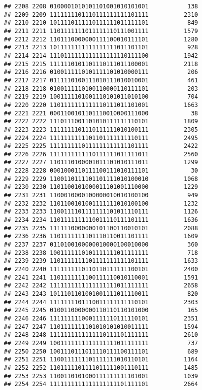 \documentclass[]{article}
\begin{document}
\begin{verbatim}
## 2208 2208 0100001010101101001010101001           138
## 2209 2209 1111111101110111111111101111          2310
## 2210 2210 1011110111110111111011111101           849
## 2211 2211 1101111111011111110111001111          1579
## 2212 2212 1101110000000111100010111101          1280
## 2213 2213 1011111111111111111011101101           928
## 2214 2214 1110111111111111111110111100          1942
## 2215 2215 1111110101101110111011100001          2118
## 2216 2216 0100111110101111101010000111           206
## 2217 2217 0111110100111010111010010001           461
## 2218 2218 0100111110100110000110111101           203
## 2219 2219 1001111101001110101011010100           704
## 2220 2220 1101111111111110111011101001          1663
## 2221 2221 0001100101101110010000111000            38
## 2222 2222 1110111001101010111111110101          1809
## 2223 2223 1111111101110111111010100111          2305
## 2224 2224 1111111111101101111111110111          2495
## 2225 2225 1111111110111111111111101111          2422
## 2226 2226 1111111111110111111011111011          2560
## 2227 2227 1101110100001011101010111011          1299
## 2228 2228 0001000110111100111010111101            30
## 2229 2229 1100110111101101111010100010          1068
## 2230 2230 1101100101000011101001110000          1229
## 2231 2231 1100010000100000010010100100           949
## 2232 2232 1101100101001111111010100100          1232
## 2233 2233 1100111101111111101011110111          1126
## 2234 2234 1101111111110011110111101111          1636
## 2235 2235 1111110000000101100110010101          2088
## 2236 2236 1101111111101110110011101111          1609
## 2237 2237 0110100100000010000100010000           360
## 2238 2238 1001111110101111111011111111           718
## 2239 2239 1101111111101111111111101111          1633
## 2240 2240 1111111110110110111111100101          2400
## 2241 2241 1101111111100111110010110001          1591
## 2242 2242 1111111111111111111011111111          2658
## 2243 2243 1011101101001001111011110011           820
## 2244 2244 1111111101110011111111110101          2303
## 2245 2245 0100110000000110110110101000           165
## 2246 2246 1111111110001111110111110101          2351
## 2247 2247 1101111111101010101010011111          1594
## 2248 2248 1111111111111110111101111111          2610
## 2249 2249 1001111111111111111011111111           737
## 2250 2250 1001110111011110111100111101           689
## 2251 2251 1100111111101111111010110101          1164
## 2252 2252 1101111101111011111001110111          1485
## 2253 2253 1100110101000111111111101001          1039
## 2254 2254 1111111111111111111101111101          2664

\end{verbatim}
\end{document}
